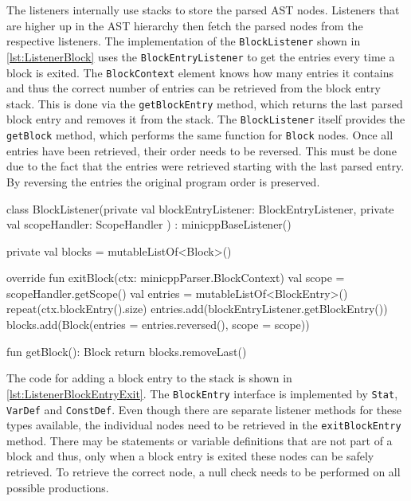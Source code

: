 The listeners internally use stacks to store the parsed AST nodes. Listeners that are higher up in the AST hierarchy then fetch the parsed nodes from the respective listeners. The implementation of the \verb|BlockListener| shown in \ref{lst:ListenerBlock} uses the \verb|BlockEntryListener| to get the entries every time a block is exited. The \verb|BlockContext| element knows how many entries it contains and thus the correct number of entries can be retrieved from the block entry stack. This is done via the \verb|getBlockEntry| method, which returns the last parsed block entry and removes it from the stack. The \verb|BlockListener| itself provides the \verb|getBlock| method, which performs the same function for \verb|Block| nodes. Once all entries have been retrieved, their order needs to be reversed. This must be done due to the fact that the entries were retrieved starting with the last parsed entry. By reversing the entries the original program order is preserved. 


\begin{KotlinCode}[float,numbers=none,caption=Implementation of the \texttt{BlockListener} class., label=lst:ListenerBlock]
class BlockListener(private val blockEntryListener: BlockEntryListener,
    private val scopeHandler: ScopeHandler
) : minicppBaseListener() {

    private val blocks = mutableListOf<Block>()
    
    override fun exitBlock(ctx: minicppParser.BlockContext) {
        val scope = scopeHandler.getScope()
        val entries = mutableListOf<BlockEntry>()
        repeat(ctx.blockEntry().size) {
            entries.add(blockEntryListener.getBlockEntry())
        }
        blocks.add(Block(entries = entries.reversed(), scope = scope))
    }
    
    fun getBlock(): Block {
        return blocks.removeLast()
    }
}
    \end{KotlinCode}


The code for adding a block entry to the stack is shown in \ref{lst:ListenerBlockEntryExit}. The \verb|BlockEntry| interface is implemented by \verb|Stat|, \verb|VarDef| and \verb|ConstDef|. Even though there are separate listener methods for these types available, the individual nodes need to be retrieved in the \verb|exitBlockEntry| method. There may be statements or variable definitions that are not part of a block and thus, only when a block entry is exited these nodes can be safely retrieved. To retrieve the correct node, a null check needs to be performed on all possible productions. 


